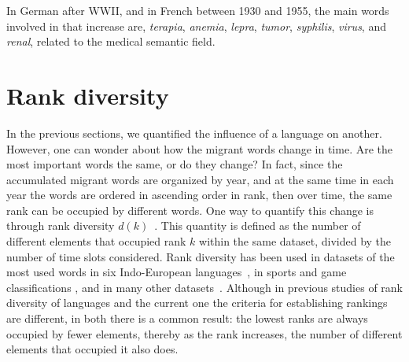 \documentclass[10pt,letterpaper]{article} %
\begin{document}
In German after WWII, and in French between 1930 and 1955, the main words
involved in that increase are, \textit{terapia}, \textit{anemia},
\textit{lepra}, \textit{tumor}, \textit{syphilis}, \textit{virus}, and
\textit{renal}, related to the medical semantic field. 



\section*{Rank diversity} %

In the previous sections, we quantified the influence of a language on another. However, 
one can wonder about how the migrant words change in time. Are the most important words
the same, or do they change? In fact, 
since the accumulated migrant words are organized by year, and at the same time
in each year the words are ordered in ascending order in rank, then over time,
the same rank can be occupied by different words. One way to quantify
this change is through rank diversity $d(k)$~\cite{iplosone}. This quantity is
defined as the number 
of different elements that occupied rank  $k$ within the same dataset, divided
by the number of time slots considered.
Rank diversity has been used in datasets of the most used words in six
Indo-European languages~\cite{iplosone,10.3389/fphy.2018.00045,Cocho2019}, in sports and game classifications \cite{Morales_epj}, 
and in many other datasets~\cite{Iniguez2022}. 
Although in previous studies of rank diversity of languages and the current one the criteria for establishing rankings are different, in both there
is a common result: the lowest ranks are always occupied by fewer
elements, thereby as the rank increases, the number of different elements that occupied it
also does.
\end{document}
